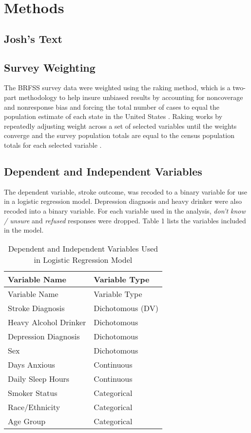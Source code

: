 \documentclass[11pt,]{article}
\begin{document}
\section{Methods}\label{methods}

\subsection{Josh's Text}\label{joshs-text}

\subsection{Survey Weighting}\label{survey-weighting}

The BRFSS survey data were weighted using the raking method, which is a
two-part methodology to help insure unbiased results by accounting for
noncoverage and nonresponse bias and forcing the total number of cases
to equal the population estimate of each state in the United States
\citep{CentersforDiseaseControlandPrevention2007a}. Raking works by
repeatedly adjusting weight across a set of selected variables until the
weights converge and the survey population totals are equal to the
census population totals for each selected variable \citep{Fricker1993}.

\subsection{Dependent and Independent
Variables}\label{dependent-and-independent-variables}

The dependent variable, stroke outcome, was recoded to a binary variable
for use in a logistic regression model. Depression diagnosis and heavy
drinker were also recoded into a binary variable. For each variable used
in the analysis, \emph{don't know / unsure} and \emph{refused} responses
were dropped. Table 1 lists the variables included in the model.

\begin{longtable}[]{@{}ll@{}}
\caption{Dependent and Independent Variables Used in Logistic Regression
Model}\tabularnewline
\toprule
Variable Name & Variable Type\tabularnewline
\midrule
\endfirsthead
\toprule
Variable Name & Variable Type\tabularnewline
\midrule
\endhead
Stroke Diagnosis & Dichotomous (DV)\tabularnewline
Heavy Alcohol Drinker & Dichotomous\tabularnewline
Depression Diagnosis & Dichotomous\tabularnewline
Sex & Dichotomous\tabularnewline
Days Anxious & Continuous\tabularnewline
Daily Sleep Hours & Continuous\tabularnewline
Smoker Status & Categorical\tabularnewline
Race/Ethnicity & Categorical\tabularnewline
Age Group & Categorical\tabularnewline
\bottomrule
\end{longtable}
\end{document}
